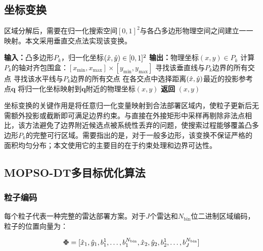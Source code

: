 \subsection{坐标变换}

区域分解后，需要在归一化搜索空间$[0,1]^2$与各凸多边形物理空间之间建立一一映射。本文采用垂直交点法实现该变换。

\begin{algorithm}[t]
\caption{垂直交点坐标变换}
\label{alg:coordinate_transform}
\begin{algorithmic}[1]
\STATE \textbf{输入：}凸多边形$P_k$，归一化坐标$(\hat{x}, \hat{y}) \in [0,1]^2$
\STATE \textbf{输出：}物理坐标$(x, y) \in P_k$
\STATE 计算$P_k$的轴对齐包围盒：$[x_{\min}, x_{\max}] \times [y_{\min}, y_{\max}]$
    \STATE 寻找该垂直线与$P_k$边界的所有交点
\ENDFOR
{}
    \STATE 寻找该水平线与$P_k$边界的所有交点
\ENDFOR
\STATE 在各交点中选择距离$(\hat{x}, \hat{y})$最近的投影参考点$\mathbf{q}$
\STATE 将归一化坐标映射到$\mathbf{q}$附近的物理坐标$(x, y)$
\STATE \textbf{返回} $(x, y)$
\end{algorithmic}
\end{algorithm}

坐标变换的关键作用是将任意归一化变量映射到合法部署区域内，使粒子更新后无需额外投影或截断即可满足边界约束。与直接在外接矩形中采样再剔除非法点相比，该方法避免了边界附近候选点被系统性丢弃的问题，使搜索过程能够覆盖凸多边形$P_k$的完整可行区域。需要指出的是，对于一般多边形，该变换不保证严格的面积均匀分布；本文使用它的主要目的在于约束处理和边界可达性。

\subsection{MOPSO-DT多目标优化算法}

\subsubsection{粒子编码}

每个粒子代表一种完整的雷达部署方案。对于$J$个雷达和$N_{\text{bin}}$位二进制区域编码，粒子的位置向量为：

\begin{equation}
\mathbf{\Phi} = [\hat{x}_1, \hat{y}_1, b_1^1, \ldots, b_1^{N_{\text{bin}}}, \hat{x}_2, \hat{y}_2, b_2^1, \ldots, b_J^{N_{\text{bin}}}]
\label{eq:particle_encoding}
\end{equation}

